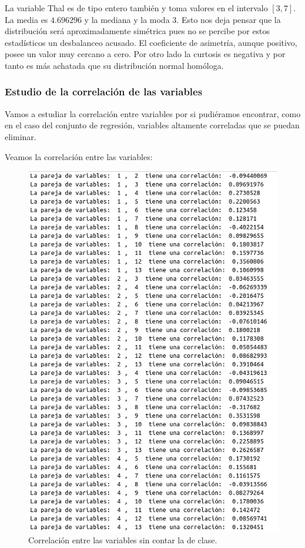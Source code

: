 \documentclass[12pt,a4paper]{article}
\begin{document}
La variable Thal es de tipo entero también y toma valores en el intervalo $[3,7]$. La media es $4.696296$ y la mediana y la moda $3$. Esto nos deja pensar que la distribución será aproximadamente simétrica pues no se percibe por estos estadísticos un desbalanceo acusado. El coeficiente de asimetría, aunque positivo, posee un valor muy cercano a cero. Por otro lado la curtosis es negativa y por tanto es más achatada que su distribución normal homóloga.

\subsubsection{Estudio de la correlación de las variables}

Vamos a estudiar la correlación entre variables por si pudiéramos encontrar, como en el caso del conjunto de regresión, variables altamente correladas que se puedan eliminar.

Veamos la correlación entre las variables:

\begin{figure}[H]
	\centering
	\includegraphics[scale=0.7]{./Imagenes/EDA/Clasificacion/correlacion_entre_variables1.png}
	\caption{Correlación entre las variables sin contar la de clase.}
\end{figure}
\end{document}
